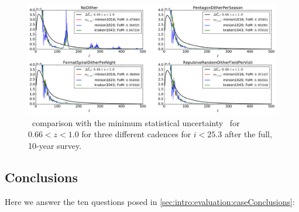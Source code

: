 \begin{figure}[!htb]
      \centering\includegraphics[width=\linewidth]{figs/awan_10yr_goldSample_3cadences.pdf}
       \vspace*{-2em}
\caption{\sigmaOS\ comparison with the minimum statistical uncertainty \statFloor\ for $0.66<z<1.0$ for three different cadences for $i<25.3$ after the full, 10-year survey.}
\label{fig: cadences: 10yr}
\end{figure}

\subsection{Conclusions}

Here we answer the ten questions posed in
\autoref{sec:intro:evaluation:caseConclusions}:

